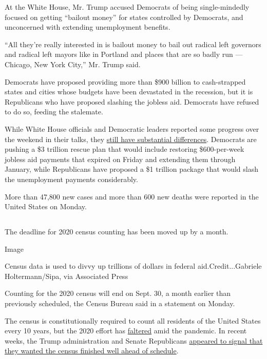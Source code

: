 At the White House, Mr. Trump accused Democrats of being single-mindedly
focused on getting ``bailout money'' for states controlled by Democrats,
and unconcerned with extending unemployment benefits.

``All they're really interested in is bailout money to bail out radical
left governors and radical left mayors like in Portland and places that
are so badly run --- Chicago, New York City,'' Mr. Trump said.

Democrats have proposed providing more than \$900 billion to
cash-strapped states and cities whose budgets have been devastated in
the recession, but it is Republicans who have proposed slashing the
jobless aid. Democrats have refused to do so, feeding the stalemate.

While White House officials and Democratic leaders reported some
progress over the weekend in their talks, they
\href{https://www.nytimes3xbfgragh.onion/2020/08/02/us/politics/coronavirus-jobless-aid.html}{still
have substantial differences}. Democrats are pushing a \$3 trillion
rescue plan that would include restoring \$600-per-week jobless aid
payments that expired on Friday and extending them through January,
while Republicans have proposed a \$1 trillion package that would slash
the unemployment payments considerably.

More than 47,800 new cases and more than 600 new deaths were reported in
the United States on Monday.

\hypertarget{-2}{%
\subsection{}\label{-2}}

The deadline for 2020 census counting has been moved up by a month.

Image

Census data is used to divvy up trillions of dollars in federal
aid.Credit...Gabriele Holtermann/Sipa, via Associated Press

Counting for the 2020 census will end on Sept. 30, a month earlier than
previously scheduled, the Census Bureau said in a statement on Monday.

The census is constitutionally required to count all residents of the
United States every 10 years, but the 2020 effort has
\href{https://www.nytimes3xbfgragh.onion/2020/04/18/us/coronavirus-census.html}{faltered}
amid the pandemic. In recent weeks, the Trump administration and Senate
Republicans
\href{https://www.nytimes3xbfgragh.onion/2020/07/28/us/trump-census.html}{appeared
to signal that they wanted the census finished well ahead of schedule}.


